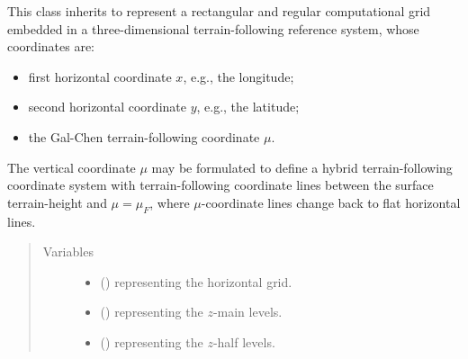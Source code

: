 \documentclass[letterpaper,10pt,english]{sphinxmanual}
\begin{document}
\begin{fulllineitems}
\label{\detokenize{api:grids.gal_chen.GalChen3d}}
This class inherits {\hyperref[\detokenize{api:grids.grid_xyz.GridXYZ}]{}} to represent a rectangular and regular computational grid
embedded in a three-dimensional terrain-following reference system, whose coordinates are:
\begin{itemize}
\item {} 
first horizontal coordinate \(x\), e.g., the longitude;

\item {} 
second horizontal coordinate \(y\), e.g., the latitude;

\item {} 
the Gal-Chen terrain-following coordinate \(\mu\).

\end{itemize}

The vertical coordinate \(\mu\) may be formulated to define a hybrid terrain-following coordinate system
with terrain-following coordinate lines between the surface terrain-height and \(\mu = \mu_F\), where
\(\mu\)-coordinate lines change back to flat horizontal lines.
\begin{quote}\begin{description}
\item[{Variables}] \leavevmode\begin{itemize}
\item {} 
 () \textendash{} {\hyperref[\detokenize{api:grids.grid_xy.GridXY}]{}} representing the horizontal grid.

\item {} 
 () \textendash{} {\hyperref[\detokenize{api:grids.axis.Axis}]{}} representing the \(z\)-main levels.

\item {} 
 () \textendash{} {\hyperref[\detokenize{api:grids.axis.Axis}]{}} representing the \(z\)-half levels.


\end{itemize}
\end{description}
\end{quote}
\end{fulllineitems}
\end{document}
